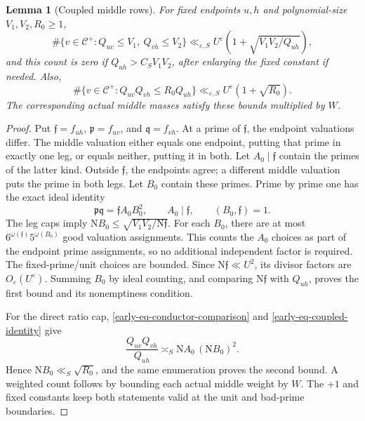 \documentclass[11pt]{article}
\newtheorem{lemma}[theorem]{Lemma}
\theoremstyle{definition}
\newcommand{\N}{\mathrm N}
\newcommand{\eps}{\varepsilon}
\newcommand{\Cplus}{\mathcal C^+}
\begin{document}
\begin{lemma}[Coupled middle rows]\label{early-lem-coupled}
For fixed endpoints \(u,h\) and polynomial-size \(V_1,V_2,R_0\ge1\),
\[
 \#\{v\in\Cplus:Q_{uv}\le V_1,\ Q_{vh}\le V_2\}
       \ll_{\eps,S}U^\eps
              \left(1+\sqrt{V_1V_2/Q_{uh}}\right),
\]
and this count is zero if \(Q_{uh}>C_SV_1V_2\), after enlarging
the fixed constant if needed.  Also,
\[
 \#\{v\in\Cplus:Q_{uv}Q_{vh}\le R_0Q_{uh}\}
       \ll_{\eps,S}U^\eps(1+\sqrt{R_0}).
\]
The corresponding actual middle masses satisfy these bounds multiplied
by \(W\).
\end{lemma}

\begin{proof}
Put \(\mathfrak f=f_{uh}\),
\(\mathfrak p=f_{uv}\), and \(\mathfrak q=f_{vh}\).
At a prime of \(\mathfrak f\), the endpoint valuations differ.
The middle valuation either equals one endpoint, putting that prime
in exactly one leg, or equals neither, putting it in both.
Let \(A_0\mid\mathfrak f\) contain the primes of the latter kind.
Outside \(\mathfrak f\), the endpoints agree; a different middle
valuation puts the prime in both legs.  Let \(B_0\) contain these
primes.  Prime by prime one has the exact ideal identity
\begin{equation}\label{early-eq-coupled-identity}
 \mathfrak p\mathfrak q=\mathfrak f A_0B_0^2,\qquad
 A_0\mid\mathfrak f,\qquad(B_0,\mathfrak f)=1.
\end{equation}
The leg caps imply
\(\N B_0\le\sqrt{V_1V_2/\N\mathfrak f}\).
For each \(B_0\), there are at most
\(6^{\omega(\mathfrak f)}5^{\omega(B_0)}\) good valuation
assignments.  This counts the \(A_0\) choices as part of the endpoint
prime assignments, so no additional independent factor is required.
The fixed-prime/unit choices are bounded.  Since
\(\N\mathfrak f\ll U^2\), its divisor factors are \(O_\eps(U^\eps)\).
Summing \(B_0\) by ideal counting, and comparing
\(\N\mathfrak f\) with \(Q_{uh}\), proves the first bound and its
nonemptiness condition.

For the direct ratio cap,
\eqref{early-eq-conductor-comparison} and
\eqref{early-eq-coupled-identity} give
\[
 \frac{Q_{uv}Q_{vh}}{Q_{uh}}
       \asymp_S \N A_0\,(\N B_0)^2.
\]
Hence \(\N B_0\ll_S\sqrt{R_0}\), and the same enumeration proves
the second bound.  A weighted count follows by bounding each actual
middle weight by \(W\).  The \(+1\) and fixed constants keep both
statements valid at the unit and bad-prime boundaries.
\end{proof}
\end{document}
